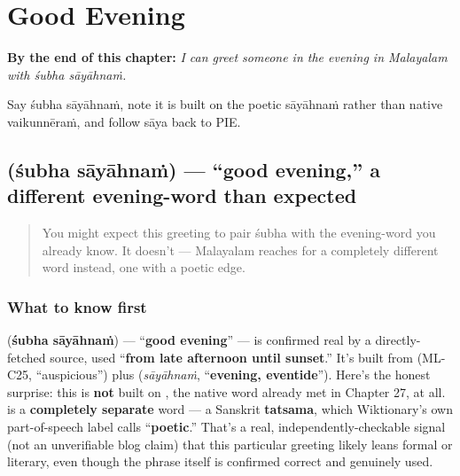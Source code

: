 
\chapter{Good Evening}
\label{ch:ml-good-evening}

\begin{chapteropening}
\textbf{By the end of this chapter:} \emph{I can greet someone in the evening in Malayalam with śubha sāyāhnaṁ.}

Say śubha sāyāhnaṁ, note it is built on the poetic sāyāhnaṁ rather than native vaikunnēraṁ, and follow sāya back to PIE.
\end{chapteropening}

\section[\texorpdfstring{\ml{ശുഭ} \ml{സായാഹ്നം} (śubha sāyāhnaṁ)}{ശുഭ സായാഹ്നം (śubha sāyāhnaṁ)}]{  (śubha sāyāhnaṁ) — \textquotedblleft{}good evening,\textquotedblright{} a different evening-word than expected}

\label{lesson:ML-C30-shubha-sayaahnam}



\begin{quote}
You might expect this greeting to pair śubha with the evening-word you already know. It doesn't — Malayalam reaches for a completely different word instead, one with a poetic edge.
\end{quote}

\subsection*{What to know first}
\textbf{ } (\textbf{śubha sāyāhnaṁ}) — \textquotedblleft{}\textbf{good evening}\textquotedblright{} — is confirmed real by a directly-fetched source, used \textquotedblleft{}\textbf{from late afternoon until sunset}.\textquotedblright{} It's built from \textbf{} (ML-C25, \textquotedblleft{}auspicious\textquotedblright{}) plus \textbf{} (\emph{sāyāhnaṁ}, \textquotedblleft{}\textbf{evening, eventide}\textquotedblright{}). Here's the honest surprise: this is \textbf{not} built on \textbf{}, the native word already met in Chapter 27, at all. \textbf{} is a \textbf{completely separate} word — a Sanskrit \textbf{tatsama}, which Wiktionary's own part-of-speech label calls \textquotedblleft{}\textbf{poetic}.\textquotedblright{} That's a real, independently-checkable signal (not an unverifiable blog claim) that this particular greeting likely leans formal or literary, even though the phrase itself is confirmed correct and genuinely used.

